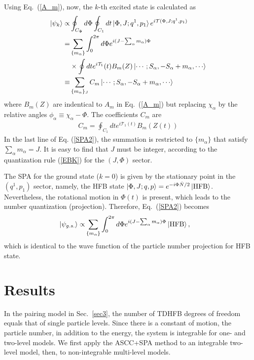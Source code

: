 \documentclass[%
superscriptaddress,
showpacs,
nofootinbib,
amsmath,amssymb,
aps,
prc,
twocolumn,
floatfix ]%
{revtex4-1}
\begin{document}
Using Eq.~(\ref{A_m}),
now, the $k$-th excited state is calculated as
\begin{align}
\ket{\psi_k} \propto& \oint_{C_\Phi} d\Phi \oint_{C_1} dt
\ket{\Phi,J;q^1,p_1} e^{i\mathcal{T}(\Phi,J;q^1,p_1)}
 \nonumber \\
	=& \sum_{\{m_\alpha\}}
	\int_0^{2\pi} d\Phi e^{i(J-\sum_\alpha m_\alpha)\Phi} \nonumber \\
&\times \oint dt e^{i\mathcal{T}_1}(t) B_m (Z) \ket{\cdots;S_\alpha,-S_\alpha+m_\alpha,\cdots} \nonumber \\
 \equiv& \sum_{\{m_\alpha\}_J} C_m \ket{\cdots;S_\alpha,-S_\alpha+m_\alpha,\cdots}
 \label{SPA2}
\end{align}
where $B_m(Z)$ are indentical to $A_m$ in Eq.~(\ref{A_m}) but
replacing $\chi_\alpha$ by the relative angles
$\phi_\alpha\equiv\chi_\alpha-\Phi$.
The coefficients $C_m$ are
\begin{align}
C_m = \oint_{C_1} dt e^{i\mathcal{T}_1(t)} B_m(Z(t))
  \label{coef}
\end{align}
In the last line of Eq. (\ref{SPA2}), the summation is restricted to
$\{m_\alpha\}$ that satisfy $\sum_\alpha m_\alpha=J$.
It is easy to find that $J$ must be integer,
according to the quantization rule (\ref{EBK}) for the $(J,\Phi)$ sector.

The SPA for the ground state ($k=0$) is given by the stationary point
in the $(q^1,p_1)$ sector,
namely, the HFB state $\ket{\Phi,J;q,p}=e^{-i\Phi\hat{N}/2}\ket{\rm HFB}$.
Nevertheless, the rotational motion in $\Phi(t)$ is present,
which leads to the number quantization (projection).
Therefore, Eq.~(\ref{SPA2}) becomes
\begin{align}
	\ket{\psi_{g.s.}} \propto& \sum_{\{m_\alpha\}}
	\int_0^{2\pi} d\Phi e^{i(J-\sum_\alpha m_\alpha)\Phi}
	\ket{\rm HFB},  
	\label{SPA3}
\end{align}
which is identical to the wave function of the particle number projection for HFB state.


\section{Results}
\label{sec4}

In the pairing model in Sec.~\ref{sec3},
the number of TDHFB degrees of freedom equals that of single particle levels.
Since there is a constant of motion, the particle number, in addition to
the energy, the system is integrable for one- and two-level models.
We first apply the ASCC+SPA method to an integrable two-level model,
then, to non-integrable multi-level models.
\end{document}
